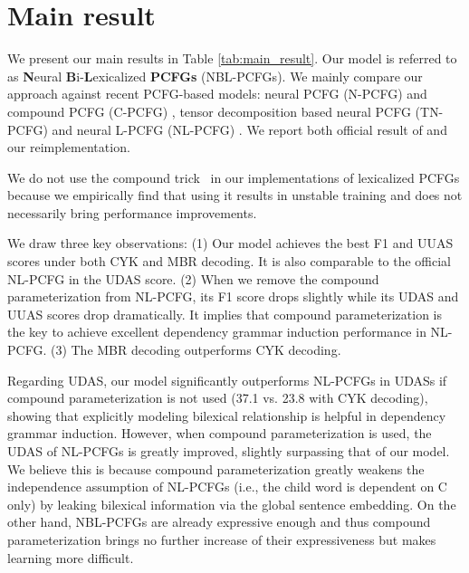 \documentclass[11pt,a4paper]{article}
\begin{document}
\section{Main result}             
We present our main results in Table \ref{tab:main_result}. Our model is referred to as \textbf{N}eural \textbf{B}i-\textbf{L}exicalized \textbf{PCFGs} (NBL-PCFGs).
We mainly compare our approach against recent PCFG-based models: neural PCFG (N-PCFG) and compound PCFG (C-PCFG) \cite{kim-etal-2019-compound}, tensor decomposition based neural PCFG (TN-PCFG) \cite{yang-etal-2021-pcfgs} and neural L-PCFG (NL-PCFG) \cite{zhu-etal-2020-return}.
We report both official result of \citet{zhu-etal-2020-return} and our reimplementation. 


We do not use the compound trick~\citep{kim-etal-2019-compound} in our implementations of lexicalized PCFGs because we empirically find that using it results in unstable training and does not necessarily bring performance improvements.





We draw three  key observations:
(1) Our model achieves the best F1 and UUAS scores under both CYK and MBR decoding. 
It is also comparable to the official NL-PCFG in the UDAS score.
(2) When we remove the compound parameterization from NL-PCFG, its F1 score drops slightly while its UDAS and UUAS scores drop dramatically. It implies that compound parameterization is the key to achieve excellent dependency grammar induction performance in NL-PCFG. 
(3) The MBR decoding outperforms CYK decoding. 



    Regarding UDAS, our model significantly outperforms NL-PCFGs in UDASs if compound parameterization is not used (37.1 vs. 23.8 with CYK decoding), showing that explicitly modeling bilexical relationship is helpful in dependency grammar induction. However, when compound parameterization is used, the UDAS of NL-PCFGs is greatly improved, slightly surpassing that of our model. We believe this is because compound parameterization greatly weakens the independence assumption of NL-PCFGs (i.e., the child word is dependent on C only) by leaking bilexical information via the global sentence embedding. On the other hand, NBL-PCFGs are already expressive enough and thus compound parameterization brings no further increase of their expressiveness but makes learning more difficult. 
\end{document}
